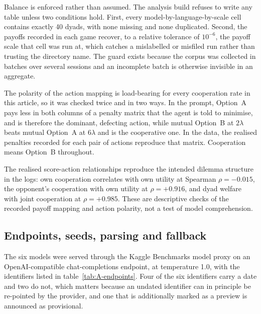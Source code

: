 \documentclass[11pt,a4paper]{article}
\newcommand{\lam}{\lambda}
\begin{document}
Balance is enforced rather than assumed. The analysis build refuses to write any table unless two conditions hold. First, every model-by-language-by-scale cell contains exactly 40 dyads, with none missing and none duplicated. Second, the payoffs recorded in each game recover, to a relative tolerance of $10^{-6}$, the payoff scale that cell was run at, which catches a mislabelled or misfiled run rather than trusting the directory name. The guard exists because the corpus was collected in batches over several sessions and an incomplete batch is otherwise invisible in an aggregate.

The polarity of the action mapping is load-bearing for every cooperation rate in this article, so it was checked twice and in two ways. In the prompt, Option~A pays less in both columns of a penalty matrix that the agent is told to minimise, and is therefore the dominant, defecting action, while mutual Option~B at $2\lam$ beats mutual Option~A at $6\lam$ and is the cooperative one. In the data, the realised penalties recorded for each pair of actions reproduce that matrix. Cooperation means Option~B throughout.

The realised score-action relationships reproduce the intended dilemma structure in the logs: own cooperation correlates with own utility at Spearman $\rho = -0.015$, the opponent's cooperation with own utility at $\rho = +0.916$, and dyad welfare with joint cooperation at $\rho = +0.985$. These are descriptive checks of the recorded payoff mapping and action polarity, not a test of model comprehension.

\subsection{Endpoints, seeds, parsing and fallback}\label{appendix:endpoints}

The six models were served through the Kaggle Benchmarks model proxy on an OpenAI-compatible chat-completions endpoint, at temperature 1.0, with the identifiers listed in table~\ref{tab:A-endpoints}. Four of the six identifiers carry a date and two do not, which matters because an undated identifier can in principle be re-pointed by the provider, and one that is additionally marked as a preview is announced as provisional.
\end{document}
